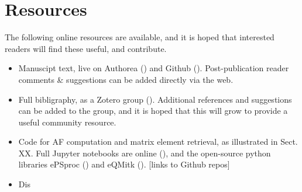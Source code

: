 \section{Resources}

The following online resources are available, and it is hoped that interested readers will find these useful, and contribute.

\begin{itemize}
\item Manuscipt text, live on Authorea () and Github (). Post-publication reader comments \& suggestions can be added directly via the web.
\item Full bibligraphy, as a Zotero group (). Additional references and suggestions can be added to the group, and it is hoped that this will grow to provide a useful community resource.
\item Code for AF computation and matrix element retrieval, as illustrated in Sect. XX. Full Jupyter notebooks are online (), and the open-source python libraries ePSproc () and eQMitk (). [links to Github repos]
\item Dis
\end{itemize}